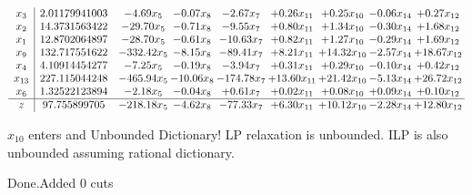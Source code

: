 \documentclass[8pt]{article}
\begin{document}
 \[\begin{array}{c| c c@{\hskip 2pt} c@{\hskip 2pt} c@{\hskip 2pt} c@{\hskip 2pt} c@{\hskip 2pt} c@{\hskip 2pt} c@{\hskip 2pt} }
 x_{3}   &  2.01179941003 & -4.69 x_{5} & -0.07 x_{8} & -2.67 x_{7} & +  0.26 x_{11} & +  0.25 x_{10} & -0.06 x_{14} & +  0.27 x_{12}\\
 x_{2}   &  14.3731563422 & -29.70 x_{5} & -0.71 x_{8} & -9.55 x_{7} & +  0.80 x_{11} & +  1.34 x_{10} & -0.30 x_{14} & +  1.68 x_{12}\\
 x_{1}   &  12.8702064897 & -28.70 x_{5} & -0.61 x_{8} & -10.63 x_{7} & +  0.82 x_{11} & +  1.27 x_{10} & -0.29 x_{14} & +  1.69 x_{12}\\
 x_{9}   &  132.717551622 & -332.42 x_{5} & -8.15 x_{8} & -89.41 x_{7} & +  8.21 x_{11} & + 14.32 x_{10} & -2.57 x_{14} & + 18.67 x_{12}\\
 x_{4}   &  4.10914454277 & -7.25 x_{5} & -0.19 x_{8} & -3.94 x_{7} & +  0.31 x_{11} & +  0.29 x_{10} & -0.10 x_{14} & +  0.42 x_{12}\\
 x_{13}   &  227.115044248 & -465.94 x_{5} & -10.06 x_{8} & -174.78 x_{7} & + 13.60 x_{11} & + 21.42 x_{10} & -5.13 x_{14} & + 26.72 x_{12}\\
 x_{6}   &  1.32522123894 & -2.18 x_{5} & -0.04 x_{8} & +  0.61 x_{7} & +  0.02 x_{11} & +  0.08 x_{10} & +  0.09 x_{14} & +  0.10 x_{12}\\
\hline
z    &  97.755899705 & -218.18 x_{5} & -4.62 x_{8} & -77.33 x_{7} & +  6.30 x_{11} & + 10.12 x_{10} & -2.28 x_{14} & + 12.80 x_{12}\\
\end{array}\]


 $ x_{10} $ enters and Unbounded Dictionary!
 LP relaxation is unbounded. ILP is also unbounded assuming rational dictionary. 

Done.Added 0 cuts 
\end{document}
